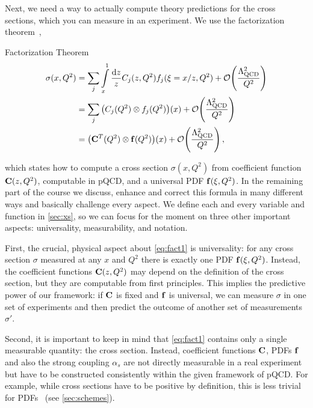 Next, we need a way to actually compute theory predictions for the cross sections, which you can measure in an experiment.
We use the factorization theorem~\cite{Collins:1989gx},
\begin{conclusionbox}{Factorization Theorem}
    \begin{align}
        \sigma(x,Q^2) &= \sum_{j} \int\limits_x^1 \frac{\dd z}{z} C_j(z,Q^2) f_j(\xi = x/z,Q^2) + \order{\frac{\LQCD^2}{Q^2}} \label{eq:fact1} \\
         &= \sum_{j} \qty(C_j(Q^2)\otimes f_j(Q^2))(x) + \order{\frac{\LQCD^2}{Q^2}} \label{eq:fact2} \\
         &= \qty(\vb C^T(Q^2) \otimes \vb f(Q^2))(x) + \order{\frac{\LQCD^2}{Q^2}}\,, \label{eq:fact3}
    \end{align}
\end{conclusionbox}
\noindent{}which states how to compute a cross section $\sigma(x,Q^2)$ from coefficient function $\vb C(z,Q^2)$, computable in pQCD, and a universal PDF $\vb f(\xi,Q^2)$.
In the remaining part of the course we discuss, enhance and correct this formula in many different ways and basically challenge every aspect.
We define each and every variable and function in \cref{sec:xs}, so we can focus for the moment on three other important aspects: universality, measurability, and notation.

First, the crucial, physical aspect about \cref{eq:fact1} is universality: for any cross section $\sigma$ measured at any $x$ and $Q^2$ there is exactly one PDF $\vb f(\xi,Q^2)$.
Instead, the coefficient functions $\vb C(z,Q^2)$ may depend on the definition of the cross section, but they are computable from first principles.
This implies the predictive power of our framework: if $\vb C$ is fixed and $\vb f$ is universal, we can measure $\sigma$ in one set of experiments and then predict the outcome of another set of measurements $\sigma'$.

Second, it is important to keep in mind that \cref{eq:fact1} contains only a single measurable quantity: the cross section.
Instead, coefficient functions $\vb C$, PDFs $\vb f$ and also the strong coupling $\alpha_s$ are not directly measurable in a real experiment but have to be constructed consistently within the given framework of pQCD.
For example, while cross sections have to be positive by definition, this is less trivial for PDFs~\cite{Candido:2020yat,Collins:2021vke,Candido:2023ujx} (see \cref{sec:schemes}).

